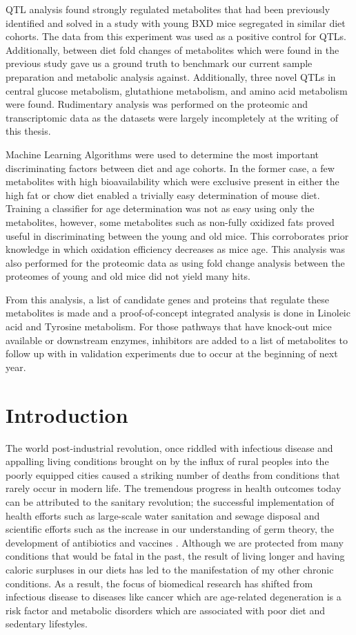 \documentclass[a4paper,11pt,twoside]{book}
\begin{document}
	QTL analysis found strongly regulated metabolites that had been previously identified and solved in a study with young BXD mice segregated in similar diet cohorts. The data from this experiment was used as a positive control for QTLs. Additionally, between diet fold changes of metabolites which were found in the previous study gave us a ground truth to benchmark our current sample preparation and metabolic analysis against. Additionally, three novel QTLs in central glucose metabolism, glutathione metabolism, and amino acid metabolism were found. Rudimentary analysis was performed on the proteomic and transcriptomic data as the datasets were largely incompletely at the writing of this thesis.

	Machine Learning Algorithms were used to determine the most important discriminating factors between diet and age cohorts. In the former case, a few metabolites with high bioavailability which were exclusive present in either the high fat or chow diet enabled a trivially easy determination of mouse diet. Training a classifier for age determination was not as easy using only the metabolites, however, some metabolites such as non-fully oxidized fats proved useful in discriminating between the young and old mice. This corroborates prior knowledge in which oxidation efficiency decreases as mice age. This analysis was also performed for the proteomic data as using fold change analysis between the proteomes of young and old mice did not yield many hits.

	From this analysis, a list of candidate genes and proteins that regulate these metabolites is made and a proof-of-concept integrated analysis is done in Linoleic acid and Tyrosine metabolism. For those pathways that have knock-out mice available or downstream enzymes, inhibitors are added to a list of metabolites to follow up with in validation experiments due to occur at the beginning of next year.
	
	\chapter{Introduction}
	
	The world post-industrial revolution, once riddled with infectious disease and appalling living conditions brought on by the influx of rural peoples into the poorly equipped cities caused a striking number of deaths from conditions that rarely occur in modern life\citep{JOEPINSKER2013}. The tremendous progress in health outcomes today can be attributed to the sanitary revolution; the successful implementation of health efforts such as large-scale water sanitation and sewage disposal and scientific efforts such as the increase in our understanding of germ theory, the development of antibiotics and vaccines \citep{Mackenbach2007}. Although we are protected from many conditions that would be fatal in the past, the result of living longer and having caloric surpluses in our diets has led to the manifestation of my other chronic conditions. As a result, the focus of biomedical research has shifted from infectious disease to diseases like cancer which are age-related degeneration is a risk factor and metabolic disorders which are associated with poor diet and sedentary lifestyles. 
	
\end{document}
